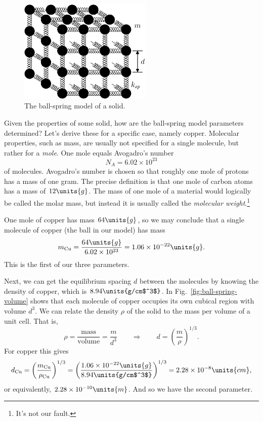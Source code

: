 \begin{figure}
\begin{center}
\includegraphics[width=2.5in]{thermal_energy_and_solids/ball-spring.eps}
\caption{The ball-spring model of a solid.}
\label{fig:ball-spring}
\end{center}
\end{figure}

Given the properties of some solid, how are the ball-spring model
parameters determined?  Let's derive these for a specific case, namely
copper.  Molecular properties, such as mass, are usually not specified
for a single molecule, but rather for a {\it mole}.  One mole equals
Avogadro's number
\begin{equation}
N_A=6.02\times 10^{23}
\end{equation} 
of molecules.  Avogadro's number is chosen so that roughly one mole of
protons has a mass of one gram.  The precise definition is that one
mole of carbon atoms has a mass of $12\units{g}$.  The mass of one mole
of a material would logically be called the molar mass, but instead it
is usually called the {\it molecular weight}.\footnote{It's not our fault.}

One mole of copper has mass $64\units{g}$, so we may conclude that a
single molecule of copper (the ball in our model) has mass
\begin{equation}
m_\text{Cu} = \frac{64\units{g}}{6.02\times 10^{23}} = 1.06\times
10^{-22}\units{g}.
\end{equation}
This is the first of our three parameters.

Next, we can get the equilibrium spacing $d$ between the molecules by
knowing the density of copper, which is $8.94\units{g/cm$^3$}$.  
In Fig.~\ref{fig:ball-spring-volume} shows that each molecule of copper
occupies its own cubical region with volume $d^3$.
We can relate the density $\rho$ of the solid to the mass per volume
of a unit cell.  That is,
\begin{equation}
\rho = \frac{\text{mass}}{\text{volume}} = \frac{m}{d^3} 
  \qquad \Rightarrow\qquad d =
\left(\frac{m}{\rho}\right)^{1/3}.
\end{equation}
For copper this gives
\begin{equation}
d_\text{Cu} = \left(\frac{m_\text{Cu}}{\rho_\text{Cu}}\right)^{1/3}
 =  \left(\frac{1.06\times
     10^{-22}\units{g}}{8.94\units{g/cm$^3$}}\right)^{1/3}
 = 2.28\times 10^{-8}\units{cm},
\end{equation}
or equivalently, $2.28\times 10^{-10}\units{m}$.
And so we have the second parameter.

